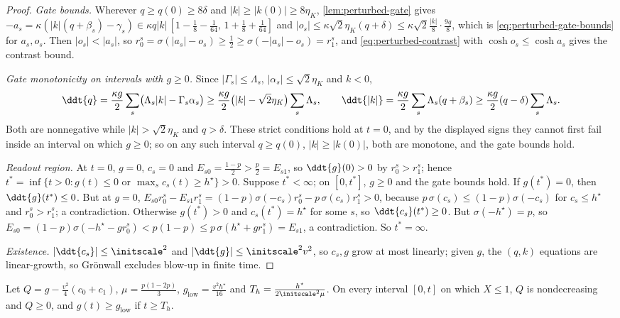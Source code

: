 \begin{proof}
\emph{Gate bounds.} Wherever $q\ge q(0)\ge8\delta$ and $|k|\ge|k(0)|\ge8\eta_K$, \cref{lem:perturbed-gate} gives
$-a_s=\kappa(|k|(q+\beta_s)-\gamma_s)\in\kappa q|k|\,[1-\frac18-\frac1{64},\,1+\frac18+\frac1{64}]$ and
$|o_s|\le\kappa\sqrt2\eta_K(q+\delta)\le\kappa\sqrt2\frac{|k|}8\cdot\frac{9q}8$, which is \cref{eq:perturbed-gate-bounds} for $a_s,o_s$. Then $|o_s|<|a_s|$,
so $r^s_0=\sigma(|a_s|-o_s)\ge\frac12\ge\sigma(-|a_s|-o_s)=r^s_1$, and \cref{eq:perturbed-contrast} with $\cosh o_s\le\cosh a_s$ gives the contrast bound.

\emph{Gate monotonicity on intervals with $g\ge0$.} Since $|\Gamma_s|\le\Lambda_s$, $|\alpha_s|\le\sqrt2\eta_K$ and $k<0$,
\[
 \ddt{q}=\frac{\kappa g}{2}\sum_s\bigl(\Lambda_s|k|-\Gamma_s\alpha_s\bigr)\ge\frac{\kappa g}{2}\bigl(|k|-\sqrt2\eta_K\bigr)\sum_s\Lambda_s,\qquad
 \ddt{|k|}=\frac{\kappa g}{2}\sum_s\Lambda_s(q+\beta_s)\ge\frac{\kappa g}{2}(q-\delta)\sum_s\Lambda_s .
\]
Both are nonnegative while $|k|>\sqrt2\eta_K$ and $q>\delta$. These strict conditions hold at $t=0$, and by the displayed signs they cannot first fail
inside an interval on which $g\ge0$; so on any such interval $q\ge q(0)$, $|k|\ge|k(0)|$, both are monotone, and the gate bounds hold.

\emph{Readout region.} At $t=0$, $g=0$, $c_s=0$ and $E_{s0}=\frac{1-p}2>\frac p2=E_{s1}$, so $\ddt{g}(0)>0$ by $r^s_0>r^s_1$; hence
$t^\ast=\inf\{t>0:g(t)\le0\text{ or }\max_sc_s(t)\ge h^\star\}>0$. Suppose $t^\ast<\infty$; on $[0,t^\ast]$, $g\ge0$ and the gate bounds hold.
If $g(t^\ast)=0$, then $\ddt{g}(t^\ast)\le0$. But at $g=0$, $E_{s0}r^s_0-E_{s1}r^s_1=(1-p)\sigma(-c_s)r^s_0-p\,\sigma(c_s)r^s_1>0$, because
$p\,\sigma(c_s)\le(1-p)\sigma(-c_s)$ for $c_s\le h^\star$ and $r^s_0>r^s_1$; a contradiction. Otherwise $g(t^\ast)>0$ and $c_s(t^\ast)=h^\star$ for some
$s$, so $\ddt{c_s}(t^\ast)\ge0$. But $\sigma(-h^\star)=p$, so $E_{s0}=(1-p)\sigma(-h^\star-gr^s_0)<p(1-p)\le p\,\sigma(h^\star+gr^s_1)=E_{s1}$, a contradiction.
So $t^\ast=\infty$.

\emph{Existence.} $|\ddt{c_s}|\le\initscale^2$ and $|\ddt{g}|\le\initscale^2v^2$, so $c_s,g$ grow at most linearly; given $g$, the $(q,k)$ equations are
linear-growth, so Gr\"onwall excludes blow-up in finite time.
\end{proof}

\begin{lemma}
\label{lem:perturbed-floor}
Let $Q=g-\frac{v^2}4(c_0+c_1)$, $\mu=\frac{p(1-2p)}3$, $g_{\mathrm{low}}=\frac{v^2h^\star}{16}$ and $T_h=\frac{h^\star}{2\initscale^2\mu}$.
On every interval $[0,t]$ on which $X\le1$, $Q$ is nondecreasing and $Q\ge0$, and $g(t)\ge g_{\mathrm{low}}$ if $t\ge T_h$.
\end{lemma}

